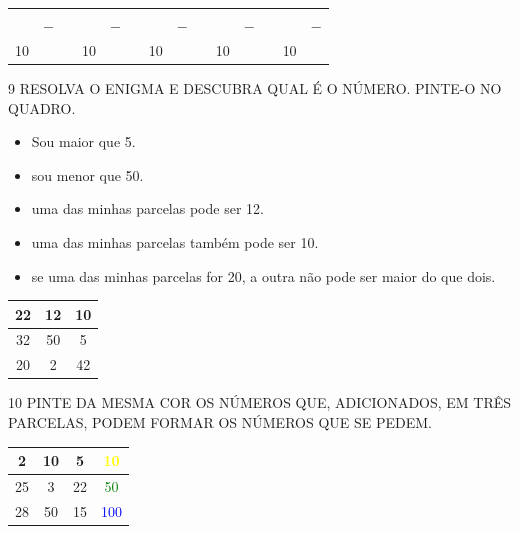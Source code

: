 \begin{center}
\begin{tabular}{llllllllllllll}
\mbox{} &  &  & \mbox{} &  &  & \mbox{} &  &  & \mbox{} &  &  & \mbox{} &  \\
\mbox{} & $-$ &  & \mbox{} & $-$ &  & \mbox{} & $-$ &  & \mbox{} & $-$ &  & \mbox{} & $-$ \\ \cline{1-1} \cline{4-4} \cline{7-7} \cline{10-10} \cline{13-13}
10 &  &  & 10 &  &  & 10 &  &  & 10 &  &  & 10 & 
\end{tabular}
\end{center}


\num{9} RESOLVA O ENIGMA E DESCUBRA QUAL É O NÚMERO. PINTE-O NO QUADRO.

\begin{itemize}
\item Sou maior que 5.

\item sou menor que 50.

\item uma das minhas parcelas pode ser 12.

\item uma das minhas parcelas também pode ser 10.

\item se uma das minhas parcelas for 20, a outra não pode ser maior do que dois.
\end{itemize}

\begin{center}
{\LARGE
\begin{tabular}{|c|c|c|}
\hline
22 & 12 & 10 \\ \hline
32 & 50 & 5 \\ \hline
20 & 2 & 42 \\ \hline
\end{tabular}
}
\end{center}


\num{10} PINTE DA MESMA COR OS NÚMEROS QUE, ADICIONADOS, EM TRÊS PARCELAS, PODEM
FORMAR OS NÚMEROS QUE SE PEDEM.

\begin{center}
{\LARGE
\begin{tabular}{|c|c|c|c|}
\hline
2 & 10 & 5 & \textcolor{yellow}{10} \\ \hline
25 & 3 & 22 & \textcolor{green}{50} \\ \hline
28 & 50 & 15 & \textcolor{blue}{100} \\ \hline
\end{tabular}
}
\end{center}

